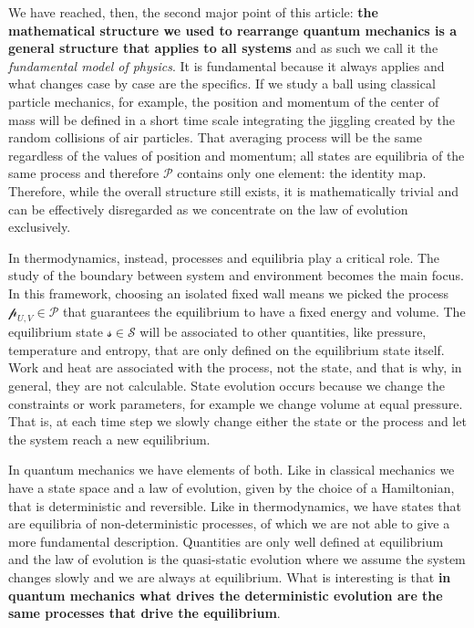 \documentclass[11pt]{article}
\begin{document}
We have reached, then, the second major point of this article: \textbf{the mathematical structure we used to rearrange quantum mechanics is a general structure that applies to all systems} and as such we call it the \emph{fundamental model of physics}. It is fundamental because it always applies and what changes case by case are the specifics. If we study a ball using classical particle mechanics, for example, the position and momentum of the center of mass will be defined in a short time scale integrating the jiggling created by the random collisions of air particles. That averaging process will be the same regardless of the values of position and momentum; all states are equilibria of the same process and therefore $\mathcal{P}$ contains only one element: the identity map. Therefore, while the overall structure still exists, it is mathematically trivial and can be effectively disregarded as we concentrate on the law of evolution exclusively.

In thermodynamics, instead, processes and equilibria play a critical role. The study of the boundary between system and environment becomes the main focus. In this framework, choosing an isolated fixed wall means we picked the process $\mathcal{p}_{U,V} \in \mathcal{P}$ that guarantees the equilibrium to have a fixed energy and volume. The equilibrium state $\mathcal{s} \in \mathcal{S}$ will be associated to other quantities, like pressure, temperature and entropy, that are only defined on the equilibrium state itself. Work and heat are associated with the process, not the state, and that is why, in general, they are not calculable. State evolution occurs because we change the constraints or work parameters, for example we change volume at equal pressure. That is, at each time step we slowly change either the state or the process and let the system reach a new equilibrium.

In quantum mechanics we have elements of both. Like in classical mechanics we have a state space and a law of evolution, given by the choice of a Hamiltonian, that is deterministic and reversible. Like in thermodynamics, we have states that are equilibria of non-deterministic processes, of which we are not able to give a more fundamental description. Quantities are only well defined at equilibrium and the law of evolution is the quasi-static evolution where we assume the system changes slowly and we are always at equilibrium. What is interesting is that \textbf{in quantum mechanics what drives the deterministic evolution are the same processes that drive the equilibrium}.
\end{document}
